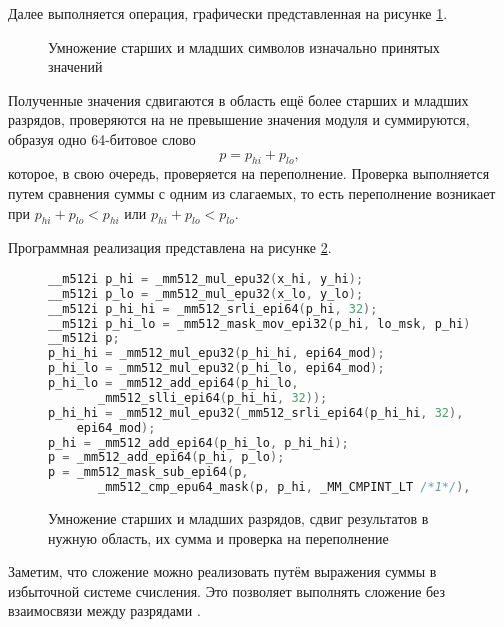 Далее выполняется операция, графически представленная на рисунке \ref{eq: vector vertical operation example}.
\begin{figure}
\centering
{}
\caption{Умножение старших и младших символов изначально принятых значений}
\label{eq: vector vertical operation example}
\end{figure}

Полученные значения сдвигаются в область ещё более старших и младших разрядов, проверяются на не превышение значения модуля и суммируются, образуя одно 64-битовое слово
$$
p = p_{hi} + p_{lo},
$$
которое, в свою очередь, проверяется на переполнение.
Проверка выполняется путем сравнения суммы с одним из слагаемых, то есть переполнение возникает при $p_{hi}+p_{lo} < p_{hi}$  или $p_{hi}+p_{lo} < p_{lo}$.

Программная реализация представлена на рисунке \ref{fig: avx512 32 bit multiplication}.
\begin{figure}
\centering
\begin{lstlisting}[language=C]
__m512i p_hi = _mm512_mul_epu32(x_hi, y_hi);
__m512i p_lo = _mm512_mul_epu32(x_lo, y_lo);
__m512i p_hi_hi = _mm512_srli_epi64(p_hi, 32);
__m512i p_hi_lo = _mm512_mask_mov_epi32(p_hi, lo_msk, p_hi);
__m512i p;
p_hi_hi = _mm512_mul_epu32(p_hi_hi, epi64_mod);
p_hi_lo = _mm512_mul_epu32(p_hi_lo, epi64_mod);
p_hi_lo = _mm512_add_epi64(p_hi_lo,
       _mm512_slli_epi64(p_hi_hi, 32));
p_hi_hi = _mm512_mul_epu32(_mm512_srli_epi64(p_hi_hi, 32),
	epi64_mod);
p_hi = _mm512_add_epi64(p_hi_lo, p_hi_hi);
p = _mm512_add_epi64(p_hi, p_lo);
p = _mm512_mask_sub_epi64(p,
       _mm512_cmp_epu64_mask(p, p_hi, _MM_CMPINT_LT /*1*/), p, m);
\end{lstlisting}
\caption{Умножение старших и младших разрядов, сдвиг результатов в нужную область, их сумма и проверка на переполнение}
\label{fig: avx512 32 bit multiplication}
\end{figure}

Заметим, что сложение можно реализовать путём выражения суммы в избыточной системе счисления.
Это позволяет выполнять сложение без взаимосвязи между разрядами \cite{ChusovLychev}.

